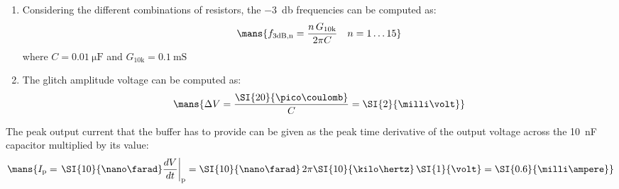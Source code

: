 \begin{enumerate}
    \item Considering the different combinations of resistors, the \SI{-3}{\decibel} frequencies can be computed as:
    \[\mans{f_\text{3dB,n}=\frac{n\,G_\text{10k}}{2\pi C}\quad n=1\dots 15}\]
    where $C=\SI{0.01}{\micro\farad}$ and $G_\text{10k}=\SI{0.1}{\milli\siemens}$
    \item The glitch amplitude voltage can be computed as:
    \[\mans{\Delta V=\frac{\SI{20}{\pico\coulomb}}{C}=\SI{2}{\milli\volt}}\]
\end{enumerate}

The peak output current that the buffer has to provide can be given as the peak time derivative of the output voltage across the \SI{10}{\nano\farad} capacitor multiplied by its value:
\[\mans{I_\text{p}=\left.\SI{10}{\nano\farad}\frac{dV}{dt}\right|_\text{p}=\SI{10}{\nano\farad}\,2\pi\SI{10}{\kilo\hertz}\,\SI{1}{\volt}=\SI{0.6}{\milli\ampere}}\]
